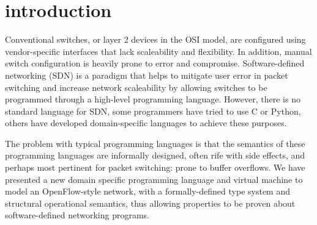
\section{introduction}
Conventional switches, or layer 2 devices in the OSI model, are configured using vendor-specific interfaces that lack scaleability and flexibility. In addition, manual switch configuration is heavily prone to error and compromise. Software-defined networking (SDN) is a paradigm that helps to mitigate user error in packet switching and increase network scaleability by allowing switches to be programmed through a high-level programming language. However, there is no standard language for SDN, some programmers have tried to use C or Python, others have developed domain-specific languages to achieve these purposes.

The problem with typical programming languages is that the semantics of these programming languages are informally designed, often rife with side effects, and perhaps most pertinent for packet switching: prone to buffer overflows. We have presented a new domain specific programming language and virtual machine to model an OpenFlow-style network, with a formally-defined type system and structural operational semantics, thus allowing properties to be proven about software-defined networking programs.
